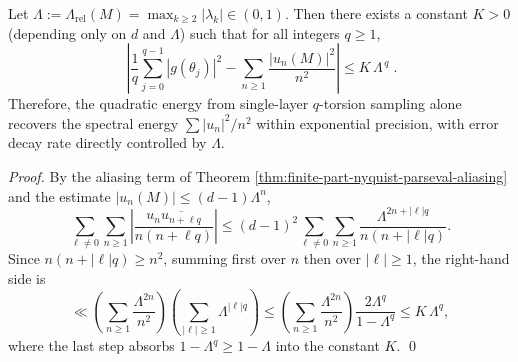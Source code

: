 \begin{corollary}\label{cor:finite-part-nyquist-error-exp}
Let \(\Lambda:=\Lambda_{\mathrm{rel}}(M)=\max_{k\ge 2}|\lambda_k|\in(0,1)\).
Then there exists a constant \(K>0\) (depending only on \(d\) and \(\Lambda\)) such that for all integers \(q\ge 1\),
\[
\boxed{\;
\left|\frac{1}{q}\sum_{j=0}^{q-1}|g(\theta_j)|^2-\sum_{n\ge 1}\frac{|u_n(M)|^2}{n^2}\right|
\le K\,\Lambda^{\,q}\; }.
\]
Therefore, the quadratic energy from single-layer \(q\)-torsion sampling alone recovers the spectral energy \(\sum |u_n|^2/n^2\) within exponential precision, with error decay rate directly controlled by \(\Lambda\).
\end{corollary}
\begin{proof}
By the aliasing term of Theorem \ref{thm:finite-part-nyquist-parseval-aliasing} and the estimate \(|u_n(M)|\le (d-1)\Lambda^{n}\),
\[
\sum_{\ell\ne 0}\sum_{n\ge 1}\left|\frac{u_n\overline{u_{n+\ell q}}}{n(n+\ell q)}\right|
\le
(d-1)^2\sum_{\ell\ne 0}\sum_{n\ge 1}\frac{\Lambda^{2n+|\ell|q}}{n(n+|\ell|q)}.
\]
Since \(n(n+|\ell|q)\ge n^2\), summing first over \(n\) then over \(|\ell|\ge 1\), the right-hand side is
\[
\ll
\left(\sum_{n\ge 1}\frac{\Lambda^{2n}}{n^2}\right)\left(\sum_{|\ell|\ge 1}\Lambda^{|\ell|q}\right)
\le
\left(\sum_{n\ge 1}\frac{\Lambda^{2n}}{n^2}\right)\frac{2\Lambda^{q}}{1-\Lambda^{q}}
\le
K\,\Lambda^{q},
\]
where the last step absorbs \(1-\Lambda^{q}\ge 1-\Lambda\) into the constant \(K\). \qed
\end{proof}
